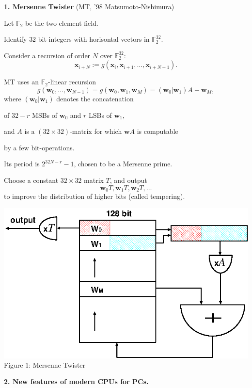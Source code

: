 \documentclass[a4j,12pt,landscape]{jarticle}
\def\F2{{\mathbb F}_2}
\def\bx{{{\mathbf x}}}
\def\bw{{{\mathbf w}}}
\begin{document}
\newpage
{\bf 1. Mersenne Twister} (MT, '98 Matsumoto-Nishimura)

Let $\F2$ be the two element field.

Identify $32$-bit integers with 
horisontal vectors in $\F2^{32}$.

Consider a recursion of order $N$ over $\F2^{32}$:
$$
\bx_{i+N}:=g(\bx_i, \bx_{i+1}, \ldots, \bx_{i+N-1}).
$$


MT uses an $\F2$-linear recursion
$$
g(\bw_0,\ldots,\bw_{N-1}) = g(\bw_0, \bw_1, \bw_M) = (\bw_0|\bw_1)A + \bw_M,
$$
where $(\bw_0|\bw_1)$ denotes
the concatenation 

of $32-r$ MSBs of $\bw_0$ and $r$ LSBs of $\bw_1$,

and $A$ is a $(32\times 32)$-matrix 
for which $\bw A$ is computable 

by a few bit-operations.

\newpage
Its period is $2^{32N-r}-1$, chosen to be a Mersenne prime.

\vskip 5mm

Choose a constant $32\times 32$ matrix $T$, 
and output
$$
\bw_0T , \bw_1T, \bw_2T, \ldots
$$
to improve the distribution of higher bits (called tempering).
\newpage
\begin{center}
\includegraphics[width=0.9\linewidth]{mt-a.eps}
\\
Figure 1: Mersenne Twister
\end{center}
\newpage
\noindent
{\bf 2. New features of modern CPUs for PCs.}
\end{document}
